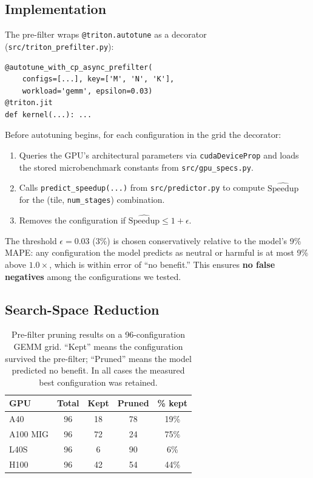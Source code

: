 \documentclass[10pt,twocolumn]{article}
\begin{document}
\subsection{Implementation}

The pre-filter wraps \texttt{@triton.autotune} as a decorator
(\texttt{src/triton\_prefilter.py}):

\begin{verbatim}
@autotune_with_cp_async_prefilter(
    configs=[...], key=['M', 'N', 'K'],
    workload='gemm', epsilon=0.03)
@triton.jit
def kernel(...): ...
\end{verbatim}

Before autotuning begins, for each configuration in the grid the
decorator:
\begin{enumerate}
\item Queries the GPU's architectural parameters via
  \texttt{cudaDeviceProp} and loads the stored microbenchmark
  constants from \texttt{src/gpu\_specs.py}.
\item Calls \texttt{predict\_speedup(...)} from
  \texttt{src/predictor.py} to compute
  $\widehat{\text{Speedup}}$ for the (tile, \texttt{num\_stages})
  combination.
\item Removes the configuration if
  $\widehat{\text{Speedup}} \leq 1 + \epsilon$.
\end{enumerate}

The threshold $\epsilon = 0.03$ (3\%) is chosen conservatively
relative to the model's 9\% MAPE: any configuration the model
predicts as neutral or harmful is at most 9\% above $1.0\times$,
which is within error of ``no benefit.''  This ensures \textbf{no
false negatives} among the configurations we tested.

\subsection{Search-Space Reduction}

\begin{table}[h]
\centering
\small
\caption{Pre-filter pruning results on a 96-configuration GEMM
grid.  ``Kept'' means the configuration survived the pre-filter;
``Pruned'' means the model predicted no benefit.  In all cases the
measured best configuration was retained.}
\label{tab:prefilter}
\renewcommand{\arraystretch}{1.2}
\begin{tabular}{@{}lcccc@{}}
\toprule
GPU & Total & Kept & Pruned & \% kept \\
\midrule
A40         & 96 & 18 & 78 & 19\% \\
A100 MIG    & 96 & 72 & 24 & 75\% \\
L40S        & 96 &  6 & 90 &  6\% \\
H100        & 96 & 42 & 54 & 44\% \\
\bottomrule
\end{tabular}
\end{table}
\end{document}
